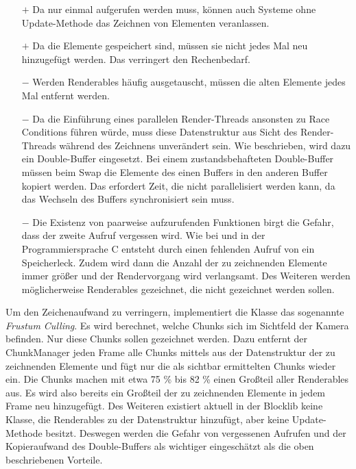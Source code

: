 \begin{itemize}
	\item[$+$] Da  nur einmal aufgerufen werden muss, können auch Systeme ohne Update-Methode das Zeichnen von Elementen veranlassen.
	\item[$+$] Da die Elemente gespeichert sind, müssen sie nicht jedes Mal neu hinzugefügt werden. Das verringert den Rechenbedarf.
	\item[$-$] Werden Renderables häufig ausgetauscht, müssen die alten Elemente jedes Mal entfernt werden.
	\item[$-$] Da die Einführung eines parallelen Render-Threads ansonsten zu Race Conditions führen würde, muss diese Datenstruktur aus Sicht des Render-Threads während des Zeichnens unverändert sein. Wie beschrieben, wird dazu ein Double-Buffer eingesetzt. Bei einem zustandsbehafteten Double-Buffer müssen beim Swap die Elemente des einen Buffers in den anderen Buffer kopiert werden. Das erfordert Zeit, die nicht parallelisiert werden kann, da das Wechseln des Buffers synchronisiert sein muss.
	\item[$-$] Die Existenz von paarweise aufzurufenden Funktionen birgt die Gefahr, dass der zweite Aufruf vergessen wird. Wie bei  und  in der Programmiersprache C entsteht durch einen fehlenden Aufruf von  ein Speicherleck. Zudem wird dann die Anzahl der zu zeichnenden Elemente immer größer und der Rendervorgang wird verlangsamt. Des Weiteren werden möglicherweise Renderables gezeichnet, die nicht gezeichnet werden sollen.
\end{itemize}

Um den Zeichenaufwand zu verringern, implementiert die Klasse  das sogenannte \emph{Frustum Culling}. Es wird berechnet, welche Chunks sich im Sichtfeld der Kamera befinden. Nur diese Chunks sollen gezeichnet werden. Dazu entfernt der ChunkManager jeden Frame alle Chunks mittels  aus der Datenstruktur der zu zeichnenden Elemente und fügt nur die als sichtbar ermittelten Chunks wieder ein. Die Chunks machen mit etwa 
75 \% bis
82 \% einen Großteil aller Renderables aus. Es wird also bereits ein Großteil der zu zeichnenden Elemente in jedem Frame neu hinzugefügt. Des Weiteren existiert aktuell in der Blocklib keine Klasse, die Renderables zu der Datenstruktur hinzufügt, aber keine Update-Methode besitzt. Deswegen werden die Gefahr von vergessenen  Aufrufen und der Kopieraufwand des Double-Buffers als wichtiger eingeschätzt als die oben beschriebenen Vorteile.

